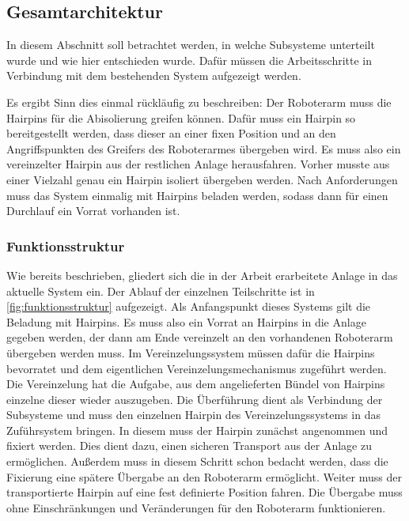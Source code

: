 \subsection{Gesamtarchitektur}\label{sec:Architektur}
In diesem Abschnitt soll betrachtet werden, in welche Subsysteme unterteilt wurde und wie hier entschieden wurde.
Dafür müssen die Arbeitsschritte in Verbindung mit dem bestehenden System aufgezeigt werden. 

Es ergibt Sinn dies
einmal rückläufig zu beschreiben: Der Roboterarm muss die Hairpins für die Abisolierung greifen können. Dafür
muss ein Hairpin so bereitgestellt werden, dass dieser an einer fixen Position und an den Angriffspunkten des Greifers
des Roboterarmes übergeben wird. Es muss also ein vereinzelter Hairpin aus der restlichen Anlage herausfahren.
Vorher musste aus einer Vielzahl genau ein Hairpin isoliert übergeben werden. Nach Anforderungen muss
das System einmalig mit Hairpins beladen werden, sodass dann für einen Durchlauf ein Vorrat vorhanden ist.
%
%
\subsubsection{Funktionsstruktur}
Wie bereits beschrieben, gliedert sich die in der Arbeit erarbeitete Anlage in das aktuelle System ein. Der Ablauf der
einzelnen Teilschritte ist in \cref{fig:funktionsstruktur} aufgezeigt. Als Anfangspunkt dieses
Systems gilt die Beladung mit Hairpins. Es muss also ein Vorrat an Hairpins in die Anlage gegeben werden, der dann am Ende
vereinzelt an den vorhandenen Roboterarm übergeben werden muss. Im Vereinzelungssystem müssen dafür die Hairpins bevorratet
und dem eigentlichen Vereinzelungsmechanismus zugeführt werden. Die Vereinzelung hat die Aufgabe, aus dem angelieferten Bündel
von Hairpins einzelne dieser wieder auszugeben. Die Überführung dient als Verbindung der Subsysteme und muss den einzelnen Hairpin
des Vereinzelungssystems in das Zuführsystem bringen. In diesem muss der Hairpin zunächst angenommen und fixiert werden. Dies dient
dazu, einen sicheren Transport aus der Anlage zu ermöglichen. Außerdem muss in diesem Schritt schon bedacht werden, dass die Fixierung
eine spätere Übergabe an den Roboterarm ermöglicht. Weiter muss der transportierte Hairpin auf eine fest definierte Position fahren.
Die Übergabe muss ohne Einschränkungen und Veränderungen für den Roboterarm funktionieren.

